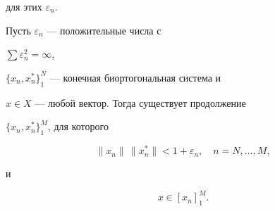 для этих $\varepsilon_n$. 


 


\begin{lem} Пусть $\varepsilon_n$ --- положительные числа с 


$\sum\varepsilon^2_n=\infty$, 


$\{x_n,x^*_n\}^N_1$ --- конечная биортогональная система и 


$x\in X$ --- любой вектор. Тогда существует продолжение 


$\{x_n,x^*_n\}^M_1$, для которого 


$$ 


\|x_n\|\,\|x^*_n\|<1+\varepsilon_n,\quad n=N,\dotsc,M, 


$$ 


и 


$$ 


x\in [x_n]^M_1. 


$$ 


\end{lem} 


 


